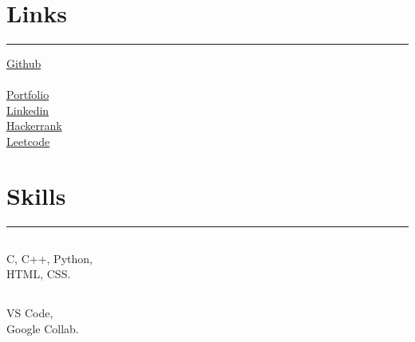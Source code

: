 \documentclass[]{rahulworld-resume}
\begin{document}
%
%

\begin{minipage}[t]{0.33\textwidth} 
\begin{large}
	\\
\end{large}
\vspace{17pt}
 


\section{Links} 
\noindent\rule{5cm}{0.4pt}

 \faGithub \enspace\href{https://github.com/sundar68}{Github} \\
 \\
 \faUser \enspace \href{https://sundar68.github.io/three}{Portfolio} \\
 
\faLinkedin \enspace\href{https://www.linkedin.com/in/keerthi-satya-sai-sundar-900a0b196}{Linkedin} \\

\faArrowCircleRight \enspace\href{https://www.hackerrank.com/sundarkeerthi111}{Hackerrank} \\

\faArrowCircleRight \enspace\href{https://leetcode.com/sundar68/}{Leetcode} 
\vspace{6pt}
\vspace{6pt}
\vspace{6pt}
\vspace{6pt}
\sectionsep
\section{Skills}
\noindent\rule{5cm}{0.4pt}

\subsection{}
\vspace{3pt}
C, C++, Python,\\
HTML, CSS.
\vspace{10pt}
\subsection{}
\vspace{3pt}
VS Code, \\
Google Collab.
\vspace{10pt}

\end{minipage}
\end{document}
